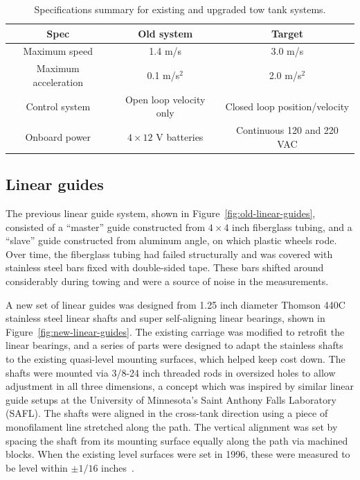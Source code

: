 \begin{table}
\centering
\begin{tabular}{c|c|c}
Spec & Old system & Target \\
\hline
Maximum speed & 1.4 m/s  & 3.0 m/s \\
Maximum acceleration & 0.1 m/s$^2$ & 2.0 m/s$^2$ \\
Control system & Open loop velocity only & Closed loop position/velocity \\
Onboard power & $4\times12$ V batteries & Continuous 120 and 220 VAC \\
\end{tabular}
\caption{Specifications summary for existing and upgraded tow tank systems.}
\label{tab:tow-tank-specs}
\end{table}


\subsection{Linear guides}

The previous linear guide system, shown in Figure~\ref{fig:old-linear-guides},
consisted of a ``master'' guide constructed from $4 \times 4$ inch fiberglass
tubing, and a ``slave'' guide constructed from aluminum angle, on which plastic
wheels rode. Over time, the fiberglass tubing had failed structurally and was
covered with stainless steel bars fixed with double-sided tape. These bars
shifted around considerably during towing and were a source of noise in the
measurements.

A new set of linear guides was designed from 1.25 inch diameter Thomson 440C
stainless steel linear shafts and super self-aligning linear bearings, shown in
Figure~\ref{fig:new-linear-guides}. The existing carriage was modified to
retrofit the linear bearings, and a series of parts were designed to adapt the
stainless shafts to the existing quasi-level mounting surfaces, which helped
keep cost down. The shafts were mounted via 3/8-24 inch threaded rods in
oversized holes to allow adjustment in all three dimensions, a concept which was
inspired by similar linear guide setups at the University of Minnesota's Saint
Anthony Falls Laboratory (SAFL). The shafts were aligned in the cross-tank
direction using a piece of monofilament line stretched along the path. The
vertical alignment was set by spacing the shaft from its mounting surface
equally along the path via machined blocks. When the existing level surfaces
were set in 1996, these were measured to be level within $\pm 1/16$
inches~\cite{Darnell1996}.

